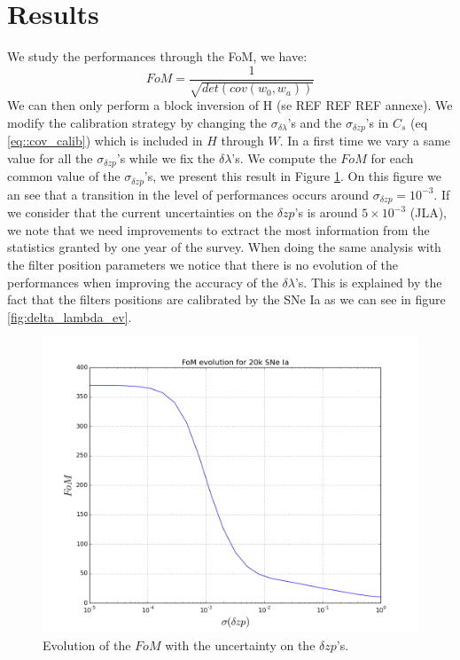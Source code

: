 \documentclass[\docopts]{\docclass}
\begin{document}
\section{Results}
\label{sec::results}
We study the performances through the FoM, we have:
\begin{equation}
FoM = \frac{1}{\sqrt{det(cov(w_0, w_a))}}
\end{equation}
We can then only perform a block inversion of H (se REF REF REF annexe).
We modify the calibration strategy by changing the $\sigma_{\delta \lambda}$'s and the $\sigma_{\delta zp}$'s in $C_s$ (eq \ref{eq::cov_calib}) which is included in $H$ through $W$.
In a first time we vary a same value for all the $\sigma_{\delta zp}$'s while we fix the $\delta \lambda$'s.
We compute the $FoM$ for each common value of the $\sigma_{\delta zp}$'s, we present this result in Figure \ref{fig:fom_zp}.
On this figure we an see that a transition in the level of performances occurs around $\sigma_{\delta zp} = 10^{-3}$.
If we consider that the current uncertainties on the $\delta zp$'s is around $5 \times 10^{-3}$ (JLA), we note that we need improvements to extract the most information from the statistics granted by one year of the survey.
When doing the same analysis with the filter position parameters we notice that there is no evolution of the performances when improving the accuracy of the $\delta\lambda$'s. This is explained by the fact that the filters positions are calibrated by the SNe Ia as we can see in figure \ref{fig:delta_lambda_ev}.

\begin{figure}[ht]
  \centering
  \includegraphics[width=0.7\linewidth]{FoM_20k.png}
  \caption{Evolution of the $FoM$ with the uncertainty on the $\delta zp$'s.}
  \label{fig:fom_zp}
\end{figure}
\end{document}
